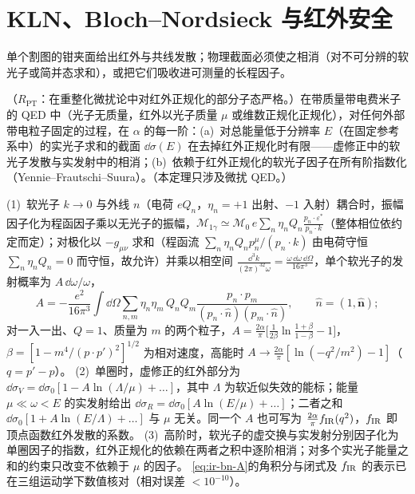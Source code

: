 \section{KLN、Bloch--Nordsieck 与红外安全}\label{sec:ir-cancellation}

单个割图的钳夹面给出红外与共线发散；物理截面必须使之相消（对不可分辨的软光子或简并态求和），或把它们吸收进可测量的长程因子。

\begin{theorem}\label{thm:ir-bn-qed}
（$R_{\mathrm{PT}}$：在重整化微扰论中对红外正规化的部分子态严格。）在带质量带电费米子的 QED 中（光子无质量，红外以光子质量 $\mu$ 或维数正规化正规化），对任何外部带电粒子固定的过程，在 $\alpha$ 的每一阶：(a)~对总能量低于分辨率 $E$（在固定参考系中）的实光子求和的截面 $\dd\sigma(E)$ 在去掉红外正规化时有限——虚修正中的软光子发散与实发射中的相消；(b)~依赖于红外正规化的软光子因子在所有阶指数化（Yennie--Frautschi--Suura）。（本定理只涉及微扰 QED。）
\end{theorem}
\begin{proofsketch}
(1)~软光子 $k\to0$ 与外线 $n$（电荷 $eQ_n$，$\eta_n=+1$ 出射、$-1$ 入射）耦合时，振幅因子化为程函因子乘以无光子的振幅，$\mathcal M_{1\gamma}\simeq\mathcal M_0\,e\sum_n\eta_nQ_n\frac{p_n\cdot\varepsilon^*}{p_n\cdot k}$（整体相位依约定而定）；对极化以 $-g_{\mu\nu}$ 求和（程函流 $\sum_n\eta_nQ_np_n^\mu/(p_n\cdot k)$ 由电荷守恒 $\sum_n\eta_nQ_n=0$ 而守恒，故允许）并乘以相空间 $\frac{\dd^3k}{(2\pi)^32\omega}=\frac{\omega\,\dd\omega\,\dd\Omega}{16\pi^3}$，单个软光子的发射概率为 $A\,\dd\omega/\omega$，
\begin{equation}\label{eq:ir-bn-A}
A=-\frac{e^2}{16\pi^3}\int\dd\Omega\sum_{n,m}\eta_n\eta_m\,Q_nQ_m\frac{p_n\cdot p_m}{(p_n\cdot\hat n)(p_m\cdot\hat n)},\qquad \hat n=(1,\hat{\mathbf n});
\end{equation}
对一入一出、$Q=1$、质量为 $m$ 的两个粒子，$A=\frac{2\alpha}{\pi}\big[\frac{1}{2\beta}\ln\frac{1+\beta}{1-\beta}-1\big]$，$\beta=[1-m^4/(p\cdot p')^2]^{1/2}$ 为相对速度，高能时 $A\to\frac{2\alpha}{\pi}[\ln(-q^2/m^2)-1]$（$q=p'-p$）。
(2)~单圈时，虚修正的红外部分为 $\dd\sigma_V=\dd\sigma_0[1-A\ln(\Lambda/\mu)+\dots]$，其中 $\Lambda$ 为软近似失效的能标；能量 $\mu\ll\omega<E$ 的实发射给出 $\dd\sigma_R=\dd\sigma_0[A\ln(E/\mu)+\dots]$；二者之和 $\dd\sigma_0[1+A\ln(E/\Lambda)+\dots]$ 与 $\mu$ 无关。同一个 $A$ 也可写为 $\frac{2\alpha}{\pi}f_{\rm IR}(q^2)$，$f_{\rm IR}$ 即顶点函数红外发散的系数\cite[第~6.4--6.5~节]{PeskinSchroeder1995}。
(3)~高阶时，软光子的虚交换与实发射分别因子化为单圈因子的指数，红外正规化的依赖在两者之积中逐阶相消；对多个实光子能量之和的约束只改变不依赖于 $\mu$ 的因子\cite{BlochNordsieck1937,YennieFrautschiSuura1961,Weinberg1965}。
\cref{eq:ir-bn-A}的角积分与闭式及 $f_{\rm IR}$ 的表示已在三组运动学下数值核对（相对误差 $<10^{-10}$）。
\end{proofsketch}

